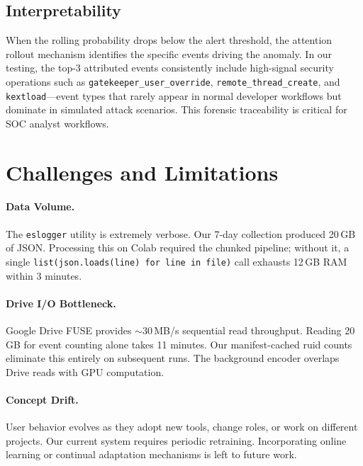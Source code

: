 \documentclass[letterpaper,twocolumn,10pt]{article}
\begin{document}
\subsection{Interpretability}

When the rolling probability drops below the alert threshold, the
attention rollout mechanism identifies the specific events driving
the anomaly. In our testing, the top-3 attributed events
consistently include high-signal security operations such as
\texttt{gatekeeper\_user\_override},
\texttt{remote\_thread\_create}, and \texttt{kextload}---event
types that rarely appear in normal developer workflows but dominate
in simulated attack scenarios. This forensic traceability is
critical for SOC analyst workflows.


\section{Challenges and Limitations}

\paragraph{Data Volume.}
The \texttt{eslogger} utility is extremely verbose. Our 7-day
collection produced 20\,GB of JSON. Processing this on Colab
required the chunked pipeline; without it, a single
\texttt{list(json.loads(line) for line in file)} call exhausts
12\,GB RAM within 3 minutes.

\paragraph{Drive I/O Bottleneck.}
Google Drive FUSE provides $\sim$30\,MB/s sequential read
throughput. Reading 20\,GB for event counting alone takes 11
minutes. Our manifest-cached ruid counts eliminate this entirely
on subsequent runs. The background encoder overlaps Drive reads
with GPU computation.

\paragraph{Concept Drift.}
User behavior evolves as they adopt new tools, change roles, or
work on different projects. Our current system requires periodic
retraining. Incorporating online learning or continual adaptation
mechanisms is left to future work.
\end{document}
